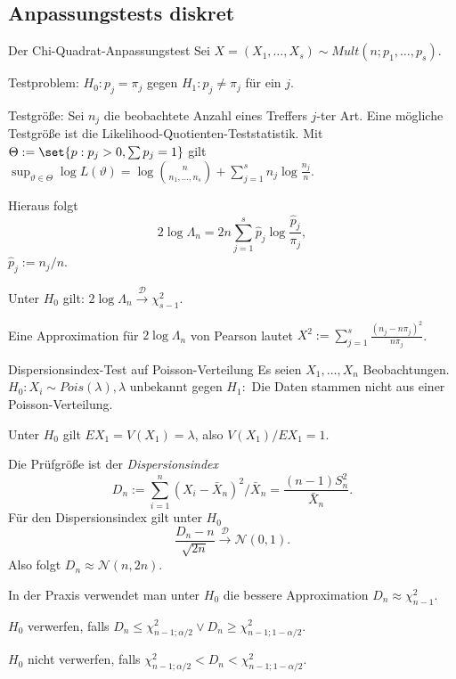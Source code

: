 \subsection{Anpassungstests diskret}

\begin{karte}{Der Chi-Quadrat-Anpassungstest}
Sei \(X = (X_1, \ldots, X_s) \sim Mult(n; p_1, \ldots, p_s)\).

Testproblem:
\(H_0: p_j = \pi_j \)
gegen \(H_1: p_j \neq \pi_j\) für ein \(j\).

Testgröße: Sei \(n_j\) die beobachtete Anzahl eines Treffers \(j\)-ter Art. 
Eine mögliche Testgröße ist die Likelihood-Quotienten-Teststatistik. 
Mit \(\Theta := \set{ p: p_j > 0, \sum p_j = 1 }\)
gilt \(\sup_{\vartheta \in \Theta} \log L(\vartheta) = \log\binom{n}{n_1, \ldots, n_s} + \sum_{j=1}^s n_j \log \frac{n_j}{n}\).

Hieraus folgt 
\[ 2 \log \Lambda_n = 2n \sum_{j=1}^s \hat{p}_j \log \frac{\hat{p}_j}{\pi_j}, \]
\(\hat{p}_j := n_j / n\).

Unter \(H_0 \) gilt: \(2 \log \Lambda_n \overset{\mathcal{D}}{\longrightarrow} \chi_{s-1}^2\).

Eine Approximation für \(2 \log \Lambda_n\) von Pearson lautet \(X^2 := \sum_{j=1}^s \frac{(n_j - n \pi_j)^2}{n \pi_j}\).
\end{karte}

\begin{karte}{Dispersionsindex-Test auf Poisson-Verteilung}
Es seien \(X_1, \ldots, X_n\) Beobachtungen. 
\(H_0: X_i \sim Pois(\lambda), \lambda \text{ unbekannt}\) gegen 
\(H_1: \) Die Daten stammen nicht aus einer Poisson-Verteilung.

Unter \(H_0\) gilt \(EX_1 = V(X_1) = \lambda\), also \(V(X_1)/EX_1 = 1\).

Die Prüfgröße ist der \textit{Dispersionsindex} 
\[ D_n := \sum_{i=1}^n (X_i - \bar{X}_n)^2 / \bar{X}_n = \frac{(n-1) S_n^2}{\bar{X}_n}. \]
Für den Dispersionsindex gilt unter \(H_0\) 
\[ \frac{D_n - n}{\sqrt{2n}} \overset{\mathcal{D}}{\longrightarrow} \mathcal{N}(0,1). \]
Also folgt \(D_n \approx \mathcal{N}(n, 2n)\).

In der Praxis verwendet man unter \(H_0\) die bessere Approximation \(D_n \approx \chi_{n-1}^2\).

\(H_0 \) verwerfen, falls \(D_n \leq \chi_{n-1;\alpha/2}^2 \vee D_n \geq \chi_{n-1;1-\alpha/2}^2\).

\(H_0\) nicht verwerfen, falls \(\chi_{n-1;\alpha/2}^2 < D_n < \chi_{n-1;1-\alpha/2}^2\).
\end{karte}

